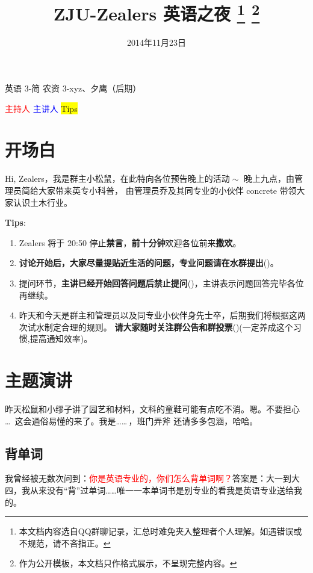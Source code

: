 \documentclass[a4paper,12pt]{ctexart}
\title{\textbf{ZJU-Zealers 英语之夜}%
	\footnote{本文档内容选自QQ群聊记录，汇总时难免夹入整理者个人理解。如遇错误或不规范，请不吝指正。}
	\footnote{作为公开模板，本文档只作格式展示，不呈现完整内容。}
}%
\author{}
\date{2014年11月23日}
\begin{document}
\maketitle
{} %
	 {英语 3-简} %
	 {农资 3-xyz、夕鹰（后期）} %
	 
\begin{center}
	\textcolor{red}{主持人} \quad \textcolor{blue}{主讲人} \quad \colorbox{yellow}{Tips}
\end{center}

\tableofcontents

\section{开场白}
\host
Hi, Zealers，我是群主小松鼠，在此特向各位预告晚上的活动$\!\sim$ 晚上九点，由管理员简给大家带来英专小科普，
由管理员乔及其同专业的小伙伴 concrete 带领大家认识土木行业。 

\textbf{Tips}:
\begin{enumerate}
	\item Zealers 将于 20:50 停止\textbf{禁言}，\textbf{前十分钟}欢迎各位前来\textbf{撒欢}。
	\item \textbf{讨论开始后，大家尽量提贴近生活的问题，专业问题请在水群提出}(\FiveStar)。
	\item 提问环节，\textbf{主讲已经开始回答问题后禁止提问}(\FiveStar)，主讲表示问题回答完毕各位再继续。
	\item 昨天和今天是群主和管理员以及同专业小伙伴身先士卒，后期我们将根据这两次试水制定合理的规则。
	  \textbf{请大家随时关注群公告和群投票}(\FiveStar)(一定养成这个习惯,提高通知效率)。
	  \end{enumerate}

\section{主题演讲}
\lecturer

昨天松鼠和小缪子讲了园艺和材料，文科的童鞋可能有点吃不消。嗯。不要担心 \ldots\ 这会通俗易懂的来了。我是……\,，班门弄斧 还请多多包涵，哈哈。


\subsection{背单词}
我曾经被无数次问到：\textcolor{red}{你是英语专业的，你们怎么背单词啊？}答案是：大一到大四，我从来没有“背”过单词……唯一一本单词书是别专业的看我是英语专业送给我的。
\end{document}
